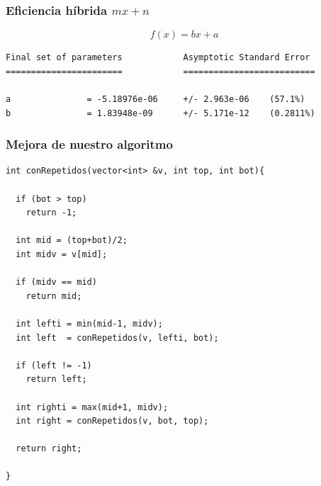 \documentclass[spanish]{beamer}
\begin{document}
\begin{frame}[fragile]\frametitle{Eficiencia híbrida $mx+n$}
  \begin{figure}[H]
  \centering   
    \end{figure}
  \end{frame}

\footnotesize %
\begin{frame}[fragile]
  \[f(x) = bx+a\]
  
\begin{verbatim}
Final set of parameters            Asymptotic Standard Error
=======================            ==========================

a               = -5.18976e-06     +/- 2.963e-06    (57.1%)
b               = 1.83948e-09      +/- 5.171e-12    (0.2811%)
\end{verbatim}
\end{frame}

\begin{frame}[fragile]\frametitle{Mejora de nuestro algoritmo}

  \begin{lstlisting}
int conRepetidos(vector<int> &v, int top, int bot){

  if (bot > top)
    return -1;

  int mid = (top+bot)/2;
  int midv = v[mid];

  if (midv == mid)
    return mid;

  int lefti = min(mid-1, midv);
  int left  = conRepetidos(v, lefti, bot);

  if (left != -1)
    return left;

  int righti = max(mid+1, midv);
  int right = conRepetidos(v, bot, top);

  return right;
      
}
\end{lstlisting}
\end{frame}
\end{document}
